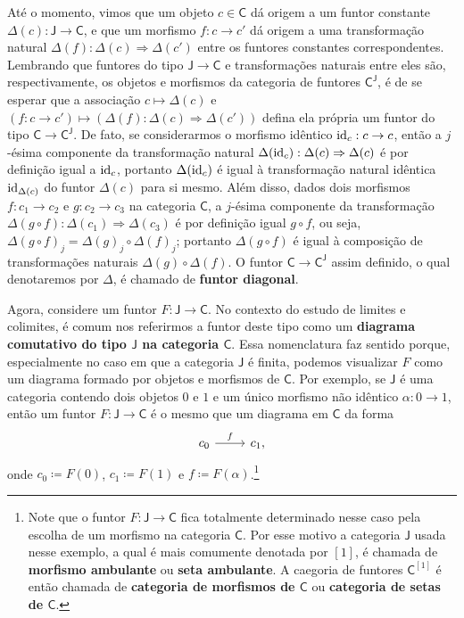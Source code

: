 Até o momento, vimos que um objeto $c \in \mathsf{C}$ dá origem a um funtor constante $\Delta(c): \mathsf{J} \to \mathsf{C}$, e que um morfismo $f: c \to c'$ dá origem a uma transformação natural $\Delta(f): \Delta(c) \Rightarrow \Delta(c')$ entre os funtores constantes correspondentes.
Lembrando que funtores do tipo $\mathsf{J} \to \mathsf{C}$ e transformações naturais entre eles são, respectivamente, os objetos e morfismos da categoria de funtores $\mathsf{C^J}$, é de se esperar que a associação $c \mapsto \Delta(c)$ e $(f: c \to c') \mapsto (\Delta(f): \Delta(c) \Rightarrow \Delta(c'))$ defina ela própria um funtor do tipo $\mathsf{C} \to \mathsf{C^J}$.
De fato, se considerarmos o morfismo idêntico $\mathrm{id}_c: c \to c$, então a $j$-ésima componente da transformação natural $\Delta(\mathrm{id}_c): \Delta(c) \Rightarrow \Delta(c)$ é por definição igual a $\mathrm{id}_c$, portanto $\Delta(\mathrm{id}_c)$ é igual à transformação natural idêntica $\mathrm{id}_{\Delta(c)}$ do funtor $\Delta(c)$ para si mesmo.
Além disso, dados dois morfismos $f: c_1 \to c_2$ e $g: c_2 \to c_3$ na categoria $\mathsf{C}$, a $j$-ésima componente da transformação $\Delta(g \circ f): \Delta(c_1) \Rightarrow \Delta(c_3)$ é por definição igual $g \circ f$, ou seja, $\Delta(g \circ f)_j = \Delta(g)_j \circ \Delta(f)_j$; portanto $\Delta(g \circ f)$ é igual à composição de transformações naturais $\Delta(g) \circ \Delta(f)$.
O funtor $\mathsf{C} \to \mathsf{C^J}$ assim definido, o qual denotaremos por $\Delta$, é chamado de \textbf{funtor diagonal}.

Agora, considere um funtor $F: \mathsf{J} \to \mathsf{C}$.
No contexto do estudo de limites e colimites, é comum nos referirmos a funtor deste tipo como um \textbf{diagrama comutativo do tipo $\mathsf{J}$ na categoria $\mathsf{C}$}.
Essa nomenclatura faz sentido porque, especialmente no caso em que a categoria $\mathsf{J}$ é finita, podemos visualizar $F$ como um diagrama formado por objetos e morfismos de $\mathsf{C}$.
Por exemplo, se $\mathsf{J}$ é uma categoria contendo dois objetos $0$ e $1$ e um único morfismo não idêntico $\alpha: 0 \to 1$, então um funtor $F: \mathsf{J} \to \mathsf{C}$ é o mesmo que um diagrama em $\mathsf{C}$ da forma
\begin{displaymath}
  \begin{tikzcd}
    c_0
    \arrow[r, "f"]
    & c_1,
  \end{tikzcd}
\end{displaymath}
onde $c_0 \coloneqq F(0)$, $c_1 \coloneqq F(1)$ e $f \coloneqq F(\alpha)$.\footnote{Note que o funtor $F: \mathsf{J} \to \mathsf{C}$ fica totalmente determinado nesse caso pela escolha de um morfismo na categoria $\mathsf{C}$. Por esse motivo a categoria $\mathsf{J}$ usada nesse exemplo, a qual é mais comumente denotada por $[1]$, é chamada de \textbf{morfismo ambulante} ou \textbf{seta ambulante}. A caegoria de funtores $\mathsf{C}^{[1]}$ é então chamada de \textbf{categoria de morfismos de $\mathsf{C}$} ou \textbf{categoria de setas de $\mathsf{C}$}.}

